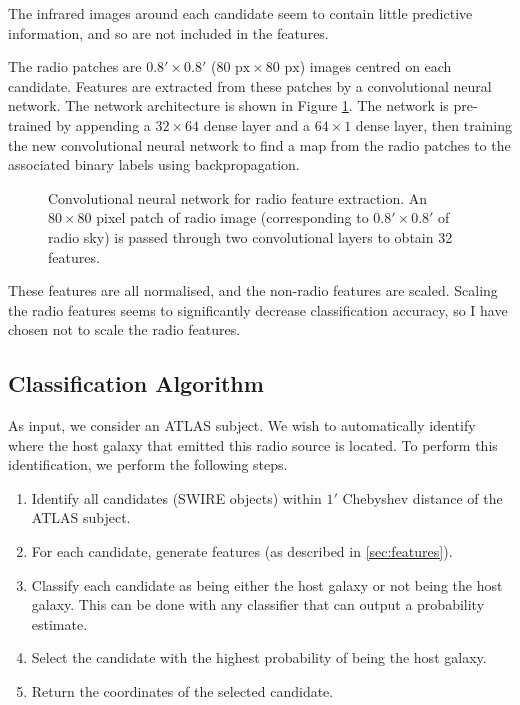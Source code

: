\documentclass[a4paper]{article}
\newcommand{\fig}{Figure }
\begin{document}
      The infrared images around each candidate seem to contain little predictive information, and so are not included in the features.

      The radio patches are $0.8' \times 0.8'$ ($80\text{ px} \times 80\text{ px}$) images centred on each candidate. Features are extracted from these patches by a convolutional neural network. The network architecture is shown in \fig \ref{fig:cnn}. The network is pre-trained by appending a $32 \times 64$ dense layer and a $64 \times 1$ dense layer, then training the new convolutional neural network to find a map from the radio patches to the associated binary labels using backpropagation.

      \begin{figure}
        \centering
        
        \caption{Convolutional neural network for radio feature extraction. An $80 \times 80$ pixel patch of radio image (corresponding to $0.8' \times 0.8'$ of radio sky) is passed through two convolutional layers to obtain 32 features.}
        \label{fig:cnn}
      \end{figure}

      These features are all normalised, and the non-radio features are scaled. Scaling the radio features seems to significantly decrease classification accuracy, so I have chosen not to scale the radio features.

    \subsection{Classification Algorithm}
      \label{sec:algorithm}

      As input, we consider an ATLAS subject. We wish to automatically identify where the host galaxy that emitted this radio source is located. To perform this identification, we perform the following steps.

      \begin{enumerate}
        \item Identify all candidates (SWIRE objects) within $1'$ Chebyshev distance of the ATLAS subject.
        \item For each candidate, generate features (as described in \ref{sec:features}).
        \item Classify each candidate as being either the host galaxy or not being the host galaxy. This can be done with any classifier that can output a probability estimate.
        \item Select the candidate with the highest probability of being the host galaxy.
        \item Return the coordinates of the selected candidate.
      \end{enumerate}
\end{document}
